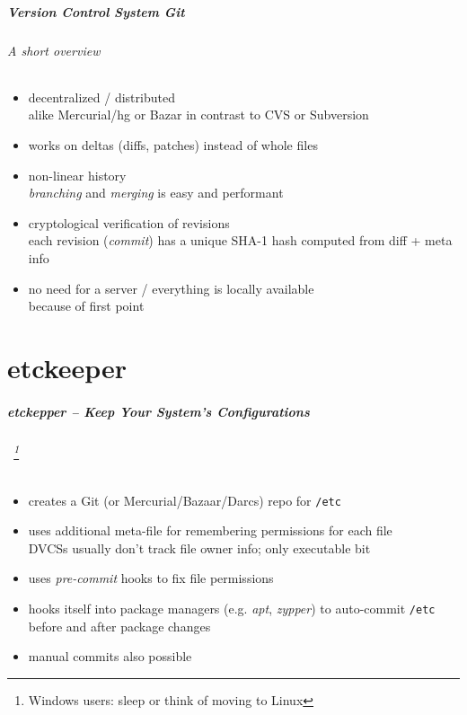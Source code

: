 \documentclass[english,hyperref={pdfpagelabels=false},aspectratio=169]{beamer}
\begin{document}
\begin{frame}[label=git]
  \frametitle{Version Control System \textit{Git}}
  \framesubtitle{A short overview}
  \begin{itemize}
    \item decentralized / distributed\\
      {\scriptsize alike Mercurial/hg or Bazar in contrast to CVS or Subversion}
    \item works on deltas {\scriptsize\color{fzjgray50}(diffs, patches)} instead of whole files
    \item non-linear history\\
      {\scriptsize \textit{branching} and \textit{merging} is easy and performant}
    \item cryptological verification of revisions\\
      {\scriptsize each revision (\textit{commit}) has a unique SHA-1 hash computed from diff + meta info}
    \item no need for a server / everything is locally available\\
      {\scriptsize because of first point}
  \end{itemize}
\end{frame}



\part{etckeeper}
\makepart

\begin{frame}[label=etckeeper]
  \frametitle{etckepper -- Keep Your System's Configurations}
  \framesubtitle{~\footnote{\tiny Windows users: sleep or think of moving to Linux}}
  \begin{itemize}
    \item creates a Git {\scriptsize\color{fzjgray50}(or Mercurial/Bazaar/Darcs)} repo for \texttt{/etc}
    \item uses additional meta-file for remembering permissions for each file\\
      {\scriptsize DVCSs usually don't track file owner info; only executable bit}
    \item uses \textit{pre-commit} hooks to fix file permissions
    \item hooks itself into package managers {\scriptsize\color{fzjgray50}(e.g. \textit{apt}, \textit{zypper})} to auto-commit \texttt{/etc} \\
      before and after package changes
    \item manual commits also possible
  \end{itemize}
\end{frame}
\end{document}
